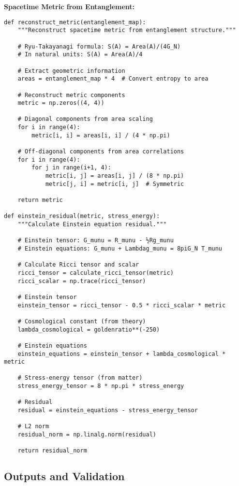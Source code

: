 \documentclass[11pt]{article}
\theoremstyle{definition}
\begin{document}
\textbf{Spacetime Metric from Entanglement:}
\begin{verbatim}
def reconstruct_metric(entanglement_map):
    """Reconstruct spacetime metric from entanglement structure."""
    
    # Ryu-Takayanagi formula: S(A) = Area(A)/(4G_N)
    # In natural units: S(A) = Area(A)/4
    
    # Extract geometric information
    areas = entanglement_map * 4  # Convert entropy to area
    
    # Reconstruct metric components
    metric = np.zeros((4, 4))
    
    # Diagonal components from area scaling
    for i in range(4):
        metric[i, i] = areas[i, i] / (4 * np.pi)
    
    # Off-diagonal components from area correlations
    for i in range(4):
        for j in range(i+1, 4):
            metric[i, j] = areas[i, j] / (8 * np.pi)
            metric[j, i] = metric[i, j]  # Symmetric
    
    return metric

def einstein_residual(metric, stress_energy):
    """Calculate Einstein equation residual."""
    
    # Einstein tensor: G_munu = R_munu - ½Rg_munu
    # Einstein equations: G_munu + Lambdag_munu = 8piG_N T_munu
    
    # Calculate Ricci tensor and scalar
    ricci_tensor = calculate_ricci_tensor(metric)
    ricci_scalar = np.trace(ricci_tensor)
    
    # Einstein tensor
    einstein_tensor = ricci_tensor - 0.5 * ricci_scalar * metric
    
    # Cosmological constant (from theory)
    lambda_cosmological = goldenratio**(-250)
    
    # Einstein equations
    einstein_equations = einstein_tensor + lambda_cosmological * metric
    
    # Stress-energy tensor (from matter)
    stress_energy_tensor = 8 * np.pi * stress_energy
    
    # Residual
    residual = einstein_equations - stress_energy_tensor
    
    # L2 norm
    residual_norm = np.linalg.norm(residual)
    
    return residual_norm
\end{verbatim}

\subsection{Outputs and Validation}
\end{document}
